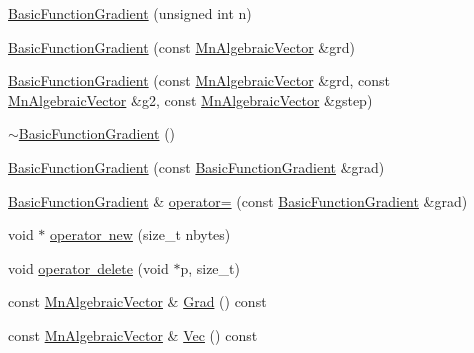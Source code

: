 \begin{DoxyCompactItemize}
\item 
\mbox{\hyperlink{classROOT_1_1Minuit2_1_1BasicFunctionGradient_ae23497e9b9a0f07542b5f6a017db6259}{Basic\+Function\+Gradient}} (unsigned int n)
\item 
\mbox{\hyperlink{classROOT_1_1Minuit2_1_1BasicFunctionGradient_aace69521fac422830a6a6e19b1f6fd77}{Basic\+Function\+Gradient}} (const \mbox{\hyperlink{namespaceROOT_1_1Minuit2_a62ed97730a1ca8d3fbaec64a19aa11c9}{Mn\+Algebraic\+Vector}} \&grd)
\item 
\mbox{\hyperlink{classROOT_1_1Minuit2_1_1BasicFunctionGradient_a21eb32598f6a67f9cb45c1f4dac05825}{Basic\+Function\+Gradient}} (const \mbox{\hyperlink{namespaceROOT_1_1Minuit2_a62ed97730a1ca8d3fbaec64a19aa11c9}{Mn\+Algebraic\+Vector}} \&grd, const \mbox{\hyperlink{namespaceROOT_1_1Minuit2_a62ed97730a1ca8d3fbaec64a19aa11c9}{Mn\+Algebraic\+Vector}} \&g2, const \mbox{\hyperlink{namespaceROOT_1_1Minuit2_a62ed97730a1ca8d3fbaec64a19aa11c9}{Mn\+Algebraic\+Vector}} \&gstep)
\item 
\mbox{\hyperlink{classROOT_1_1Minuit2_1_1BasicFunctionGradient_a55ce8afeb4e559cf2d2c88aca167b524}{$\sim$\+Basic\+Function\+Gradient}} ()
\item 
\mbox{\hyperlink{classROOT_1_1Minuit2_1_1BasicFunctionGradient_a1193087c872c26bca560f069f2efc353}{Basic\+Function\+Gradient}} (const \mbox{\hyperlink{classROOT_1_1Minuit2_1_1BasicFunctionGradient}{Basic\+Function\+Gradient}} \&grad)
\item 
\mbox{\hyperlink{classROOT_1_1Minuit2_1_1BasicFunctionGradient}{Basic\+Function\+Gradient}} \& \mbox{\hyperlink{classROOT_1_1Minuit2_1_1BasicFunctionGradient_a1bf2f76bab802466b8697136fbea33e4}{operator=}} (const \mbox{\hyperlink{classROOT_1_1Minuit2_1_1BasicFunctionGradient}{Basic\+Function\+Gradient}} \&grad)
\item 
void $\ast$ \mbox{\hyperlink{classROOT_1_1Minuit2_1_1BasicFunctionGradient_a2b08ebb0074a43cfca91f74991c660d5}{operator new}} (size\+\_\+t nbytes)
\item 
void \mbox{\hyperlink{classROOT_1_1Minuit2_1_1BasicFunctionGradient_acc4585a778dae54497b4c4342a4dcd1e}{operator delete}} (void $\ast$p, size\+\_\+t)
\item 
const \mbox{\hyperlink{namespaceROOT_1_1Minuit2_a62ed97730a1ca8d3fbaec64a19aa11c9}{Mn\+Algebraic\+Vector}} \& \mbox{\hyperlink{classROOT_1_1Minuit2_1_1BasicFunctionGradient_a724c9b5e8c9cf8646eb362017158f52d}{Grad}} () const
\item 
const \mbox{\hyperlink{namespaceROOT_1_1Minuit2_a62ed97730a1ca8d3fbaec64a19aa11c9}{Mn\+Algebraic\+Vector}} \& \mbox{\hyperlink{classROOT_1_1Minuit2_1_1BasicFunctionGradient_a4c0d60175db412ac03313f824a055886}{Vec}} () const

\end{DoxyCompactItemize}

